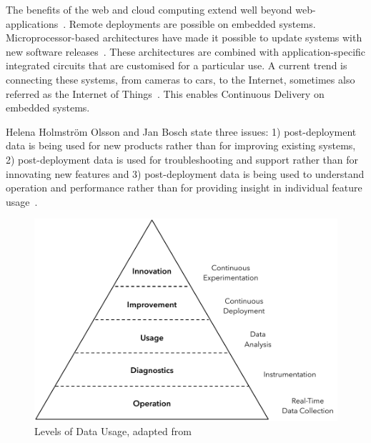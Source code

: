 \documentclass[english]{tktltiki2}
\begin{document}
The benefits of the web and cloud computing extend well beyond web-applications~\cite{BE12}. Remote deployments are possible on embedded systems. Microprocessor-based architectures have made it possible to update systems with new software releases~\cite{RA03}. These architectures are combined with application-specific integrated circuits that are customised for a particular use. A current trend is connecting these systems, from cameras to cars, to the Internet, sometimes also referred as the Internet of Things~\cite{BE12, HB14}. This enables Continuous Delivery on embedded systems.

Helena Holmström Olsson and Jan Bosch state three issues: 1) post-deployment data is being used for new products rather than for improving existing systems, 2) post-deployment data is used for troubleshooting and support rather than for innovating new features and 3) post-deployment data is being used to understand operation and performance rather than for providing insight in individual feature usage~\cite{HB14}.

\begin{figure}[h!]

    \centering

    \includegraphics[scale = 0.6]{figures/data-usage}

    \caption{Levels of Data Usage, adapted from~\cite{HB14}}
    \label{figure:data-usage}

    \vspace{1cm}

\end{figure}
\end{document}

